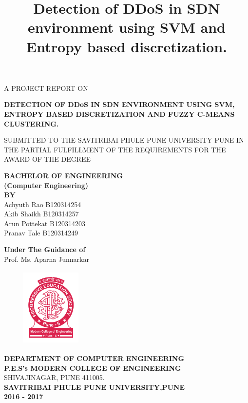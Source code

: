 \documentclass[12pt,a4paper,final]{report}
\title{Detection of DDoS in SDN environment using SVM and Entropy based discretization.}
\begin{document}
\begin{center}
\thispagestyle{empty}
\vspace*{1cm}
A PROJECT REPORT ON
\vspace*{0.75cm}

\Large
\textbf{
DETECTION OF DDoS IN SDN ENVIRONMENT USING SVM, ENTROPY  BASED DISCRETIZATION AND FUZZY C-MEANS CLUSTERING.
}
\vspace*{0.75cm}

\normalsize
SUBMITTED TO THE SAVITRIBAI PHULE PUNE UNIVERSITY PUNE IN THE PARTIAL FULFILLMENT OF THE REQUIREMENTS FOR THE AWARD OF THE DEGREE
\vspace*{0.5cm}

\large
\textbf{
BACHELOR OF ENGINEERING\\
(Computer Engineering)\\
\vspace*{0.3cm}
BY\\
}
\vspace*{0.3cm}
\normalsize
Achyuth Rao \hspace*{2.2cm} B120314254 \\
Akib Shaikh \hspace*{2.4cm} B120314257 \\
Arun Pottekat \hspace*{2.2cm} B120314203 \\
Pranav Tale \hspace*{2.5cm} B120314249 \\
\vspace*{0.4cm}

\large
\textbf{
Under The Guidance of \\
}
\normalsize
\vspace*{0.2cm}
Prof. Ms. Aparna Junnarkar

\normalsize
\begin{figure}[h]
\begin{center}
\includegraphics[width=3cm, height=4cm]{collegelogo.png}
\end{center}
\end{figure}

\textbf{
\large
\vspace*{0.2cm}
DEPARTMENT OF COMPUTER ENGINEERING \\
P.E.S's MODERN COLLEGE OF ENGINEERING \\
}
\normalsize
SHIVAJINAGAR, PUNE 411005. \\
\textbf{
\large
\linebreak
\vspace*{0.2cm}
SAVITRIBAI PHULE PUNE UNIVERSITY,PUNE \\
2016 - 2017 
}
\end{center}
\newpage
\end{document}
